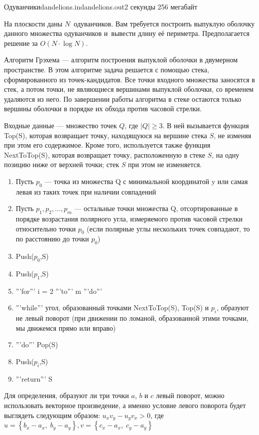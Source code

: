 ﻿\begin{problem}{Одуванчики}{dandelions.in}{dandelions.out}{2 секунды}
{256 мегабайт}

На плоскости даны $N$~одуванчиков. Вам требуется построить выпуклую оболочку данного множества одуванчиков и~вывести длину её периметра.
Предполагается решение за $O(N \cdot \log{N})$. 

Алгоритм Грэхема --- алгоритм построения выпуклой оболочки в двумерном пространстве. 
В этом алгоритме задача решается с помощью стека, сформированного из точек-кандидатов. 
Все точки входного множества заносятся в стек, а потом точки, не являющиеся вершинами выпуклой оболочки, 
со временем удаляются из него. 
По завершении работы алгоритма в стеке остаются только вершины оболочки в порядке их обхода против часовой стрелки.

Входные данные --- множество точек $Q$, где $|Q|\geqslant 3$. 
В ней вызывается функция Top(S), которая возвращает точку, 
находящуюся на вершине стека $S$, не изменяя при этом его содержимое. 
Кроме того, используется также функция NextToTop(S), 
которая возвращает точку, расположенную в стеке $S$, 
на одну позицию ниже от верхней точки; стек $S$ при этом не изменяется.


\begin{enumerate}
 \item Пусть $p_0$ — точка из множества Q с минимальной координатой y или самая левая из таких точек при наличии совпадений
 \item Пусть $p_1, p_2,\ldots,p_m$ — остальные точки множества Q, отсортированные в порядке возрастания полярного угла,
       измеряемого против часовой стрелки относительно точки $p_0$ 
      (если полярные углы нескольких точек совпадают, то по расстоянию до точки $p_0$)
 \item Push($p_0$,S)
 \item Push($p_1$,S)
 \item '''for''' i = 2 '''to''' m '''do'''
 \item     '''while''' угол, образованный точками NextToTop(S), Top(S) и $p_i$, образуют не левый поворот
             (при движении по ломаной, образованной этими точками, мы движемся прямо или вправо)
 \item       '''do''' Pop(S)
 \item    Push($p_i$,S)
 \item '''return''' S
\end{enumerate}

Для определения, образуют ли три точки $a$, $b$ и $c$ 
левый поворот, можно использовать векторное произведение, а именно условие 
левого поворота будет выглядеть следующим образом: 
$u_x v_y - u_y v_x > 0$, где $ u = \left\{ b_x - a_x, \; b_y - a_y \right\},
v = \left\{ c_x - a_x, \; c_y - a_y \right\}$


\end{problem}
